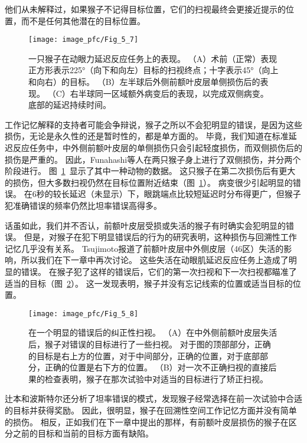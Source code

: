 他们从未解释过，如果猴子不记得目标位置，它们的扫视最终会更接近提示的位置，而不是任何其他潜在的目标位置。


\begin{figure}
	\centering
	\texttt{[image: image\_pfc/Fig\_5\_7]}
	\caption{一只猴子在动眼力延迟反应任务上的表现。
		（A）术前（正常）表现正方形表示225°（向下和向左）目标的扫视终点；十字表示45°（向上和向右）的目标。
		（B）左半球后外侧前额叶皮层单侧损伤后的表现。
		（C）右半球同一区域额外病变后的表现，以完成双侧病变。
		底部的延迟持续时间\cite{funahashi1993dorsolateral}。}
	\label{fig:fig_5_7}
\end{figure}


工作记忆解释的支持者可能会争辩说，猴子之所以不会犯明显的错误，是因为这些损伤，无论是永久性的还是暂时性的，都是单方面的。
毕竟，我们知道在标准延迟反应任务中，中外侧前额叶皮层的单侧损伤只会引起轻度损伤\cite{rosen1975effects}，而双侧损伤后的损伤是严重的\cite{goldman1971analysis}。
因此，Funahashi等人\cite{funahashi1993dorsolateral}在两只猴子身上进行了双侧损伤，并分两个阶段进行。
图~\ref{fig:fig_5_7}~显示了其中一种动物的数据。
这只猴子在第二次损伤后有更大的损伤，但大多数扫视仍然在目标位置附近结束（图~\ref{fig:fig_5_7}）。
病变很少引起明显的错误。
在6秒的较长延迟（未显示）下，眼跳端点比较短延迟时分布得更广，但猴子犯准确错误的频率仍然比坦率错误高得多。


话虽如此，我们并不否认，前额叶皮层受损或失活的猴子有时确实会犯明显的错误。
但是，对猴子在犯下明显错误后的行为的研究表明，这种损伤与回溯性工作记忆几乎没有关系。
Tsujimoto\cite{tsujimoto2012prefrontal}报道了前额叶皮层中外侧皮层（46区）失活的影响，所以我们在下一章中再次讨论。
这些失活在动眼肌延迟反应任务上造成了明显的错误。
在猴子犯了这样的错误后，它们的第一次扫视和下一次扫视都瞄准了适当的目标（图~\ref{fig:fig_5_8}）。
这一发现表明，猴子并没有忘记线索的位置或适当目标的位置。


\begin{figure}
	\centering
	\texttt{[image: image\_pfc/Fig\_5\_8]}
	\caption{在一个明显的错误后的纠正性扫视。
		（A）在中外侧前额叶皮层失活后，猴子对错误的目标进行了一些扫视。
		对于图的顶部部分，正确的目标是右上方的位置，对于中间部分，正确的位置，对于底部部分，正确的位置是右下方的位置。
		（B）对一次不正确扫视的直接后果的检查表明，猴子在那次试验中对适当的目标进行了矫正扫视\cite{tsujimoto2012prefrontal}。}
	\label{fig:fig_5_8}
\end{figure}


辻本和波斯特尔还分析了坦率错误的模式，发现猴子经常选择在前一次试验中合适的目标并获得奖励。
因此，很明显，猴子在回溯性空间工作记忆方面并没有简单的损伤。
相反，正如我们在下一章中提出的那样，有前额叶皮层损伤的猴子在区分之前的目标和当前的目标方面有缺陷。


